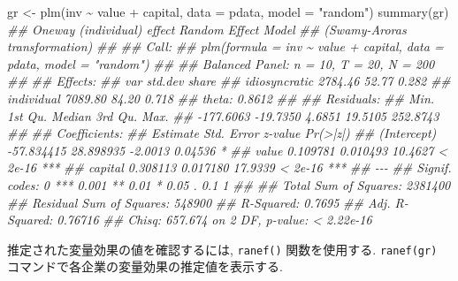 \documentclass[
  letterpaper,
  xelatex,
  ja=standard, xelatex]{bxjsbook}
\newenvironment{Shaded}{\begin{snugshade}}{\end{snugshade}}
\newcommand{\AttributeTok}[1]{\textcolor[rgb]{0.40,0.45,0.13}{#1}}
\newcommand{\DocumentationTok}[1]{\textcolor[rgb]{0.37,0.37,0.37}{\textit{#1}}}
\newcommand{\FunctionTok}[1]{\textcolor[rgb]{0.28,0.35,0.67}{#1}}
\newcommand{\NormalTok}[1]{\textcolor[rgb]{0.00,0.23,0.31}{#1}}
\newcommand{\OtherTok}[1]{\textcolor[rgb]{0.00,0.23,0.31}{#1}}
\newcommand{\SpecialCharTok}[1]{\textcolor[rgb]{0.37,0.37,0.37}{#1}}
\newcommand{\StringTok}[1]{\textcolor[rgb]{0.13,0.47,0.30}{#1}}
\begin{document}
\begin{Shaded}
\begin{Highlighting}[]
\NormalTok{gr }\OtherTok{\textless{}{-}} \FunctionTok{plm}\NormalTok{(inv }\SpecialCharTok{\textasciitilde{}}\NormalTok{ value }\SpecialCharTok{+}\NormalTok{ capital, }\AttributeTok{data =}\NormalTok{ pdata, }\AttributeTok{model =} \StringTok{"random"}\NormalTok{)}
\FunctionTok{summary}\NormalTok{(gr)}
\DocumentationTok{\#\# Oneway (individual) effect Random Effect Model }
\DocumentationTok{\#\#    (Swamy{-}Arora\textquotesingle{}s transformation)}
\DocumentationTok{\#\# }
\DocumentationTok{\#\# Call:}
\DocumentationTok{\#\# plm(formula = inv \textasciitilde{} value + capital, data = pdata, model = "random")}
\DocumentationTok{\#\# }
\DocumentationTok{\#\# Balanced Panel: n = 10, T = 20, N = 200}
\DocumentationTok{\#\# }
\DocumentationTok{\#\# Effects:}
\DocumentationTok{\#\#                   var std.dev share}
\DocumentationTok{\#\# idiosyncratic 2784.46   52.77 0.282}
\DocumentationTok{\#\# individual    7089.80   84.20 0.718}
\DocumentationTok{\#\# theta: 0.8612}
\DocumentationTok{\#\# }
\DocumentationTok{\#\# Residuals:}
\DocumentationTok{\#\#      Min.   1st Qu.    Median   3rd Qu.      Max. }
\DocumentationTok{\#\# {-}177.6063  {-}19.7350    4.6851   19.5105  252.8743 }
\DocumentationTok{\#\# }
\DocumentationTok{\#\# Coefficients:}
\DocumentationTok{\#\#               Estimate Std. Error z{-}value Pr(\textgreater{}|z|)    }
\DocumentationTok{\#\# (Intercept) {-}57.834415  28.898935 {-}2.0013  0.04536 *  }
\DocumentationTok{\#\# value         0.109781   0.010493 10.4627  \textless{} 2e{-}16 ***}
\DocumentationTok{\#\# capital       0.308113   0.017180 17.9339  \textless{} 2e{-}16 ***}
\DocumentationTok{\#\# {-}{-}{-}}
\DocumentationTok{\#\# Signif. codes:  0 \textquotesingle{}***\textquotesingle{} 0.001 \textquotesingle{}**\textquotesingle{} 0.01 \textquotesingle{}*\textquotesingle{} 0.05 \textquotesingle{}.\textquotesingle{} 0.1 \textquotesingle{} \textquotesingle{} 1}
\DocumentationTok{\#\# }
\DocumentationTok{\#\# Total Sum of Squares:    2381400}
\DocumentationTok{\#\# Residual Sum of Squares: 548900}
\DocumentationTok{\#\# R{-}Squared:      0.7695}
\DocumentationTok{\#\# Adj. R{-}Squared: 0.76716}
\DocumentationTok{\#\# Chisq: 657.674 on 2 DF, p{-}value: \textless{} 2.22e{-}16}
\end{Highlighting}
\end{Shaded}

推定された変量効果の値を確認するには, \texttt{ranef()} 関数を使用する.
\texttt{ranef(gr)} コマンドで各企業の変量効果の推定値を表示する.
\end{document}
